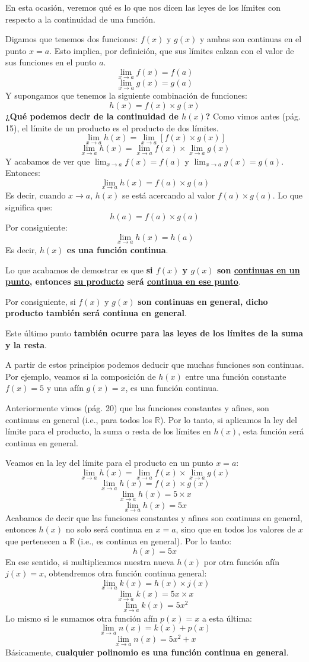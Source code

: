 \documentclass[12pt]{article}
\begin{document}
En esta ocasión, veremos qué es lo que nos dicen las leyes de los límites con respecto a la continuidad de una función.

Digamos que tenemos dos funciones: $f(x)$ y $g(x)$ y ambas son continuas en el punto $x = a$. Esto implica, por definición, que sus límites calzan con el valor de sus funciones en el punto $a$.
\[\lim_{x \to a} f(x) = f(a)\]
\[\lim_{x \to a} g(x) = g(a)\]
Y supongamos que tenemos la siguiente combinación de funciones:
\[h(x) = f(x) \times g(x)\]
\textbf{¿Qué podemos decir de la continuidad de $h(x)$?} Como vimos antes (pág. 15), el límite de un producto es el producto de dos límites.
\[\lim_{x \to a} h(x) = \lim_{x \to a}[f(x) \times g(x)]\]
\[\lim_{x \to a} h(x) = \lim_{x \to a} f(x) \times \lim_{x \to a} g(x)\]
Y acabamos de ver que $\lim_{x \to a} f(x) = f(a)$ y $\lim_{x \to a} g(x) = g(a)$. Entonces:
\[\lim_{x \to a} h(x) = f(a) \times g(a)\]
Es decir, cuando $x \to a$, $h(x)$ se está acercando al valor $f(a) \times g(a)$. Lo que significa que:
\[h(a) = f(a) \times g(a)\]
Por consiguiente:
\[\lim_{x \to a} h(x) = h(a)\]
Es decir, \textbf{$h(x)$ es una función continua}.

Lo que acabamos de demostrar es que \textbf{si $f(x)$ y $g(x)$ son \underline{continuas en un punto}, entonces \underline{su producto} será \underline{continua en ese punto}}.

Por consiguiente, si $f(x)$ y $g(x)$ \textbf{son continuas en general, dicho producto también será continua en general}.

Este último punto \textbf{también ocurre para las leyes de los límites de la suma y la resta}.

A partir de estos principios podemos deducir que muchas funciones son continuas. Por ejemplo, veamos si la composición de $h(x)$ entre una función constante $f(x) = 5$ y una afín $g(x) = x$, es una función continua.

Anteriormente vimos (pág. 20) que las funciones constantes y afines, son continuas en general (i.e., para todos los $\mathbb{R}$). Por lo tanto, si aplicamos la ley del límite para el producto, la suma o resta de los límites en $h(x)$, esta función será continua en general. 

Veamos en la ley del límite para el producto en un punto $x = a$:
\[\lim_{x \to a} h(x) = \lim_{x \to a} f(x) \times \lim_{x \to a} g(x)\]
\[\lim_{x \to a} h(x) = f(x) \times g(x)\]
\[\lim_{x \to a} h(x) = 5 \times x\]
\[\lim_{x \to a} h(x) = 5x\]
Acabamos de decir que las funciones constantes y afines son continuas en general, entonces $h(x)$ no solo será continua en $x=a$, sino que en todos los valores de $x$ que pertenecen a $\mathbb{R}$ (i.e., es continua en general). Por lo tanto:
\[h(x) = 5x\]
En ese sentido, si multiplicamos nuestra nueva $h(x)$ por otra función afín $j(x) = x$, obtendremos otra función continua general:
\[\lim_{x \to a} k(x) = h(x) \times j(x)\]
\[\lim_{x \to a} k(x) = 5x \times x\]
\[\lim_{x \to a} k(x) = 5x^{2}\]
Lo mismo si le sumamos otra función afín $p(x) = x$ a esta última:
\[\lim_{x \to a} n(x) = k(x) + p(x)\]
\[\lim_{x \to a} n(x) = 5x^{2} + x\]
Básicamente, \textbf{cualquier polinomio es una función continua en general}.
\end{document}
